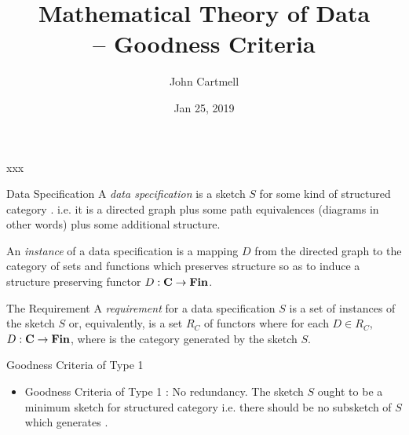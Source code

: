 \documentclass[xcolor=pst,dvips]{beamer}   %
\title[John Cartmell]{Mathematical Theory of Data \\ -- Goodness Criteria}
\author{John Cartmell}
\institute{Ad Otium}
\date{Jan 25, 2019}
\begin{document}
\begin{frame}{xxx}
\titlepage
\end{frame}

\iffalse
\begin{frame}{Introduction}
\begin{itemize}
\item
What types of things are there and how are they related? 
\begin{itemize}
\pause \item Data specifications provide the answer to this question in the context of a software development. 
\pause \item Types theories provide the answer in the context of mathematics. 
\pause \item Category theory abstracts across both these domains.
\end{itemize}
\end{itemize}
\end{frame}
\fi

\begin{frame}{Data Specification}
A \textit{data specification} is a sketch $S$ for some kind of structured category \catc.
i.e. it is a directed graph plus some path equivalences (diagrams in other words) plus 
some additional structure.  

An \textit{instance} of a data specification is a mapping $D$ from the directed graph
to the category of sets and functions which preserves structure so as
to induce a structure preserving functor $D: \textbf{C} \rightarrow \textbf{Fin}$.
\end{frame}

\begin{frame}{The Requirement}
A \textit{requirement} for a data specification $S$ 
is a set of instances of the sketch $S$ or, equivalently, is a set $R_C$ of functors where for each
$D \in R_C$, $D: \textbf{C} \rightarrow \textbf{Fin}$, where \catcw is the category generated by the sketch $S$.
\end{frame}


\begin{frame}{Goodness Criteria of Type 1}
\begin{itemize}
\item Goodness Criteria of Type 1 : No redundancy. The sketch $S$ ought to be a minimum sketch for structured
category \catcw i.e. there should be no subsketch of $S$ which generates  \catc.
\end{itemize}
\end{frame}
\end{document}
